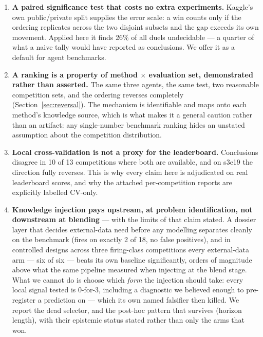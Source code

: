 \documentclass[11pt,a4paper]{article}
\begin{document}
\begin{enumerate}[leftmargin=*]
  \item \textbf{A paired significance test that costs no extra experiments.} Kaggle's own
  public/private split supplies the error scale: a win counts only if the ordering replicates
  across the two disjoint subsets and the gap exceeds its own movement. Applied here it finds
  26\% of all duels undecidable --- a quarter of what a naive tally would have reported as
  conclusions. We offer it as a default for agent benchmarks.

  \item \textbf{A ranking is a property of method $\times$ evaluation set, demonstrated rather
  than asserted.} The same three agents, the same test, two reasonable competition sets, and
  the ordering reverses completely (Section~\ref{sec:reversal}). The mechanism is identifiable
  and maps onto each method's knowledge source, which is what makes it a general caution rather
  than an artifact: any single-number benchmark ranking hides an unstated assumption about the
  competition distribution.

  \item \textbf{Local cross-validation is not a proxy for the leaderboard.} Conclusions
  disagree in 10 of 13 competitions where both are available, and on s3e19 the direction fully
  reverses. This is why every claim here is adjudicated on real leaderboard scores, and why the
  attached per-competition reports are explicitly labelled CV-only.

  \item \textbf{Knowledge injection pays upstream, at problem identification, not downstream at
  blending} --- with the limits of that claim stated. A dossier layer that decides external-data
  need before any modelling separates cleanly on the benchmark (fires on exactly 2 of 18, no
  false positives), and in controlled designs across three firing-class competitions every external-data arm ---
  six of six --- beats its own baseline significantly, orders of magnitude above what the same
  pipeline measured when injecting at the blend stage. What we cannot do is choose which
  \emph{form} the injection should take: every local signal tested is 0-for-3, including a
  diagnostic we believed enough to pre-register a prediction on --- which its own named
  falsifier then killed. We report the dead selector, and the post-hoc pattern that survives
  (horizon length), with their epistemic status stated rather than only the arms that won.
\end{enumerate}
\end{document}
